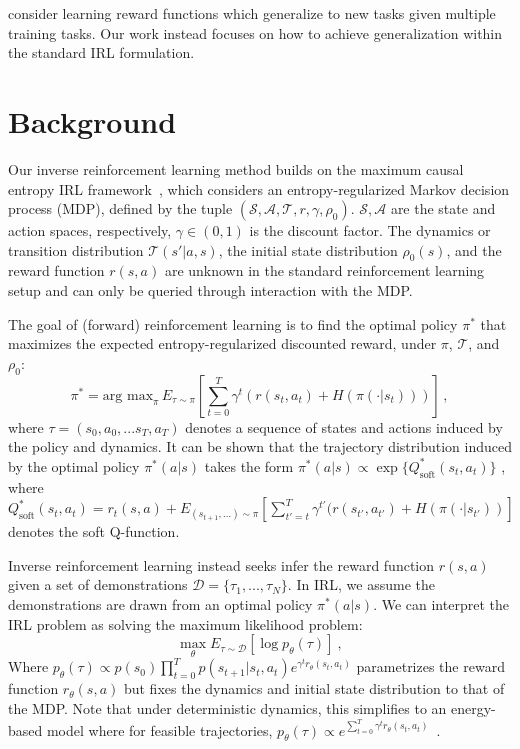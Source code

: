 \documentclass{article} \usepackage{iclr2018_conference,times}
\begin{document}
\citet{Amin17} consider learning reward functions which generalize to new tasks given multiple training tasks. Our work instead focuses on how to achieve generalization within the standard IRL formulation. 
\section{Background}
\label{sec:background}

Our inverse reinforcement learning method builds on the maximum causal entropy IRL framework~\citep{Ziebart10}, which considers an entropy-regularized Markov decision process (MDP), defined by the tuple $(\mathcal{S}, \mathcal{A}, \mathcal{T}, r, \gamma, \rho_0)$. $\mathcal{S}, \mathcal{A}$ are the state and action spaces, respectively, $\gamma \in (0, 1)$ is the discount factor. The dynamics or transition distribution $\mathcal{T}(s'|a,s)$, the initial state distribution $\rho_0(s)$, and the reward function $r(s,a)$ are unknown in the standard reinforcement learning setup and can only be queried through interaction with the MDP. 

The goal of (forward) reinforcement learning is to find the optimal policy $\pi^*$ that maximizes the expected entropy-regularized discounted reward, under $\pi$, $\mathcal{T}$, and $\rho_0$:
\[
\pi^* = 
\textrm{arg max}_{\pi} {
	\,E_{\tau \sim \pi}\left[  \sum_{t=0}^T \gamma^t (r(s_t, a_t) + H(\pi(\cdot|s_t))) \right]
    }\, ,
\]
where $\tau = (s_0, a_0, ... s_T, a_T)$ denotes a sequence of states and actions induced by the policy and dynamics. It can be shown that the trajectory distribution induced by the optimal policy $\pi^*(a|s)$ takes the form $\pi^*(a|s) \propto \exp\{Q^*_\textrm{soft}(s_t, a_t)\}$ \citep{Ziebart10, Haarnoja2017}, where $Q^*_\textrm{soft}(s_t, a_t) = r_t(s,a) + E_{(s_{t+1}, ...) \sim \pi}[\sum_{t'=t}^T \gamma^{t'}(r(s_{t'}, a_{t'}) + H(\pi(\cdot|s_{t'}))]$ denotes the soft Q-function.

Inverse reinforcement learning instead seeks infer the reward function $r(s,a)$ given a set of demonstrations $\mathcal{D} = \{\tau_1, ..., \tau_N \}$. In IRL, we assume the demonstrations are drawn from an optimal policy $\pi^*(a|s)$. We can interpret the IRL problem as solving the maximum likelihood problem:
\begin{equation}
\label{eqn:maxlike_irl}
\max_\theta E_{\tau \sim \mathcal{D}}\left[\log p_\theta(\tau)\right]\ ,
\end{equation}
Where $p_\theta(\tau) \propto p(s_0) \prod_{t=0}^T p(s_{t+1}|s_t,a_t) e^{\gamma^t  r_\theta(s_t, a_t)}$ parametrizes the reward function $r_\theta(s,a)$ but fixes the dynamics and initial state distribution to that of the MDP. Note that under deterministic dynamics, this simplifies to an energy-based model where for feasible trajectories, $p_\theta(\tau) \propto e^{\sum_{t=0}^T \gamma^t r_\theta(s_t, a_t)}$~\citep{Ziebart08}.
\end{document}
